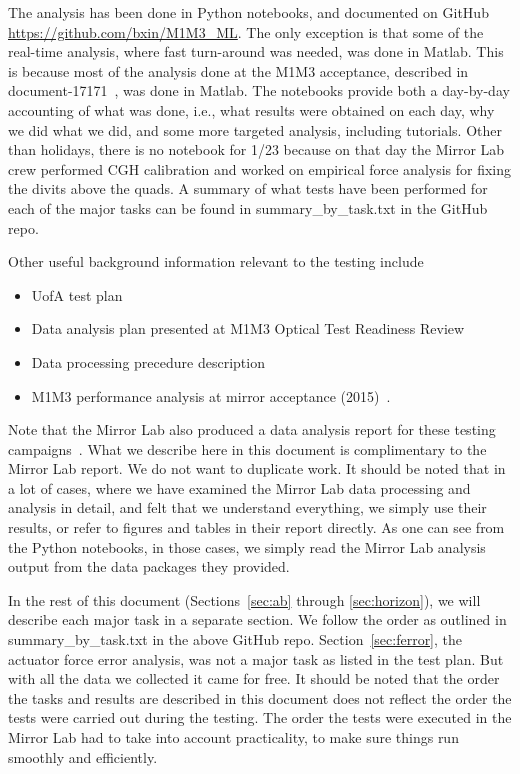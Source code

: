 \documentclass [twoside,openbib,12pt]{article}
\newcommand{\bitm}{\begin{itemize}}
\newcommand{\eitm}{\end{itemize}}
\begin{document}
The analysis has been done in Python notebooks, and documented on
GitHub \url{https://github.com/bxin/M1M3_ML}.
The only exception is that some of the real-time analysis, where fast
turn-around was needed, was done in Matlab. This is because most of
the analysis done at the M1M3 acceptance, described in document-17171~\cite{m1m3perf},
was done in Matlab.
The notebooks provide both a day-by-day accounting of what was done, i.e.,
what results were obtained on each day, why we did what we did, and some more targeted
analysis, including tutorials.
Other than holidays, there is no notebook for 1/23 because on that day
the Mirror Lab crew performed CGH calibration and worked on
empirical force analysis for fixing the divits above the quads.
A summary of what tests have been performed for each of the major
tasks can be found in summary\_by\_task.txt in the GitHub repo. 

Other useful background information relevant to the testing include
\bitm
\item UofA test plan~\cite{m1m3UAtestplan}
\item  Data analysis plan presented at M1M3 Optical Test Readiness
  Review~\cite{m1m3anaplan}
\item Data processing precedure description~\cite{m1m3processing}
\item M1M3 performance analysis at mirror acceptance (2015)~\cite{m1m3perf}.
\eitm
Note that the Mirror Lab also produced a data analysis report for
these testing campaigns~\cite{m1m3UAreport}. What we describe here in this document is
complimentary to the Mirror Lab report.
We do not want to duplicate work. 
It should be noted that in a lot of cases, where we have examined the
Mirror Lab data processing and analysis in detail, and felt that we
understand everything, we simply use their results, or refer to
figures and tables in their report directly.
As one can see from the Python notebooks, in those cases, we simply
read the Mirror Lab analysis output from the data packages they provided.

In the rest of this document (Sections~\ref{sec:ab} through \ref{sec:horizon}), we will describe each major task in a
separate section. We follow the order as outlined in
summary\_by\_task.txt in the above GitHub repo.
Section~\ref{sec:ferror}, the actuator force error analysis, was not a
major task as listed in the test plan.
But with all the data we collected it came for free.
It should be noted that the order the tasks and results are described
in this document does not reflect the order the tests were carried out
during the testing.
The order the tests were executed in the Mirror Lab had to take into
account practicality, to make sure things run smoothly and efficiently.
\end{document}
